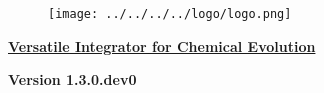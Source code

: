 
\begin{center}
\begin{figure}[!h]
\centering
\texttt{[image: ../../../../logo/logo.png]}
\end{figure}
\underline{\LARGE \textbf{Versatile Integrator for Chemical Evolution}}
\par
{\Large \textbf{Version 1.3.0.dev0}}
\end{center}
